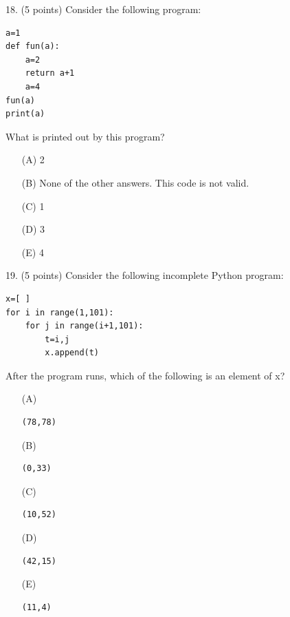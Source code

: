 \documentclass{article}
\begin{document}
\noindent
\begin{minipage}{\textwidth}
18. (5 points)
Consider the following program:
\begin{verbatim}
a=1
def fun(a):
    a=2
    return a+1
    a=4
fun(a)
print(a)
\end{verbatim}
What is printed out by this program?

\begin{enumerate}
\item[(A)]
2

\item[(B)]
None of the other answers. This code is not valid.

\item[(C)]
1

\item[(D)]
3

\item[(E)]
4

\end{enumerate}
\end{minipage}
\vspace{10em}
\filbreak\vfil{}\vfilneg

\noindent
\begin{minipage}{\textwidth}
19. (5 points)
Consider the following incomplete Python program:
\begin{verbatim}
x=[ ]
for i in range(1,101):
    for j in range(i+1,101):
        t=i,j
        x.append(t)
\end{verbatim}
After the program runs, which of the following is an element of x?

\begin{enumerate}
\item[(A)]
\begin{verbatim}(78,78)\end{verbatim}

\item[(B)]
\begin{verbatim}(0,33)\end{verbatim}

\item[(C)]
\begin{verbatim}(10,52)\end{verbatim}

\item[(D)]
\begin{verbatim}(42,15)\end{verbatim}

\item[(E)]
\begin{verbatim}(11,4)\end{verbatim}

\end{enumerate}
\end{minipage}
\vspace{10em}
\filbreak\vfil{}\vfilneg
\end{document}
